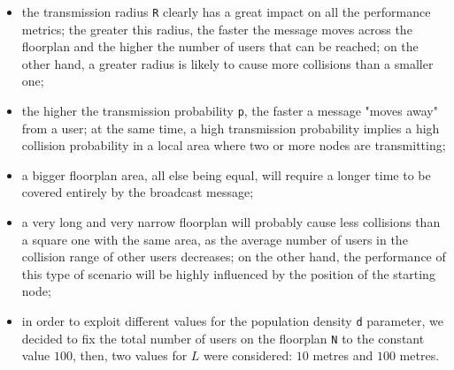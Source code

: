 \begin{itemize}
    \item the transmission radius \texttt{R} clearly has a great impact on all
    the performance metrics; the greater this radius, the faster the message
    moves across the floorplan and the higher the number of users that can be
    reached; on the other hand, a greater radius is likely to cause more
    collisions than a smaller one;
    \item the higher the transmission probability \texttt{p}, the faster a
    message "moves away" from a user; at the same time, a high transmission
    probability implies a high collision probability in a local area where two
    or more nodes are transmitting;
    \item a bigger floorplan area, all else being equal, will require a longer
    time to be covered entirely by the broadcast message;
    \item a very long and very narrow floorplan will probably cause less
    collisions than a square one with the same area, as the average number of
    users in the collision range of other users decreases; on the other hand,
    the performance of this type of scenario will be highly influenced by the
    position of the starting node;
    \item in order to exploit different values for the population density
    \texttt{d} parameter, we decided to fix the total number of users on the
    floorplan \texttt{N} to the constant value $100$, then, two values for $L$
    were considered: $10$ metres and $100$ metres.
\end{itemize}
